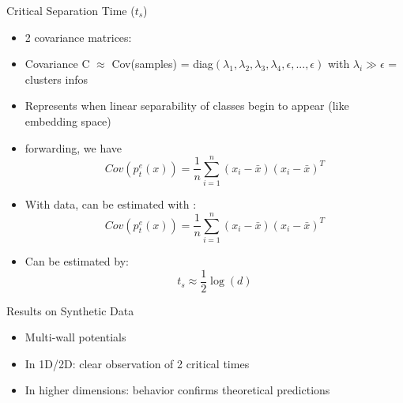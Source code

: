 \documentclass[aspectratio=169]{beamer}
\begin{document}
\begin{frame}{Critical Separation Time ($t_s$)}
    \begin{itemize}
    
        \item 2 covariance matrices:
        
        \item Covariance C $\approx$ Cov(samples) = diag$(\lambda_1, \lambda_2, \lambda_3, \lambda_4, \epsilon, ..., \epsilon)$ with $\lambda_i \gg \epsilon$ = clusters infos
        
        \item Represents when linear separability of classes begin to appear (like embedding space)
        
        \item forwarding, we have 
        \begin{equation}
            Cov(p_t^e(x)) = \frac{1}{n} \sum_{i=1}^n (x_i - \bar{x})(x_i - \bar{x})^T
        \end{equation}
        
        \item With data, can be estimated with :
        \begin{equation}
            Cov(p_t^e(x)) = \frac{1}{n} \sum_{i=1}^n (x_i - \bar{x})(x_i - \bar{x})^T
        \end{equation}
        
        \item Can be estimated by:
        \begin{equation}
            t_s \approx \frac{1}{2}\log(d)
        \end{equation}
    \end{itemize}
    
    \begin{center}
    \end{center}
\end{frame}

\begin{frame}{Results on Synthetic Data}
    \begin{itemize}
        \item Multi-wall potentials
        \item In 1D/2D: clear observation of 2 critical times
        \item In higher dimensions: behavior confirms theoretical predictions
    \end{itemize}
    
    \begin{center}
    \end{center}
\end{frame}
\end{document}
